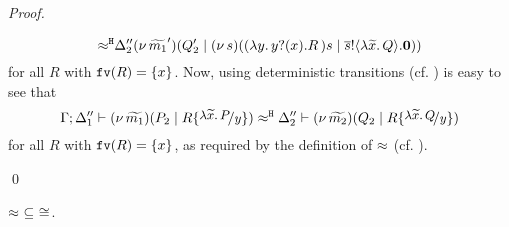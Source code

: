 \begin{proof}
\begin{enumerate}[1.]
\[				{\approx^\mathtt{H}}
				{\Delta_2''}{}{(\nu\, \widetilde{m_1}')(Q_2' \;|\; (\nu\, s)((\lambda y.\,y ? (x) . R\, {)}{s}  \;|\; \overline{s} ! \langle \lambda \widetilde{x}.\,Q \rangle . \mathbf{0} ) )}
			\]
			for all $R$ with $\mathtt{fv}(R) = \{x\}$. Now, 
			using deterministic transitions (cf. ) is easy to see that
			\[
				\horel{\Gamma}{\Delta_1''}{\newsp{\widetilde{m_1}}{P_2 \Par  R \subst{\abs{\widetilde{x}}{P}}{y}}}{\hwb}{\Delta_2''}{\newsp{\widetilde{m_2}}{Q_2 \Par R \subst{\abs{\widetilde{x}}{Q}}{y}}}
			\]
			for all $R$ with $\mathtt{fv}(R) = \{x\}$, as required by the definition of $\approx$ (cf. ).\\
			

	\end{enumerate}
	\qed
\end{proof}



\begin{lemma}
	\label{app:lem:wbc_is_cong}
	$\approx\ \subseteq\ \cong$.
\end{lemma}


